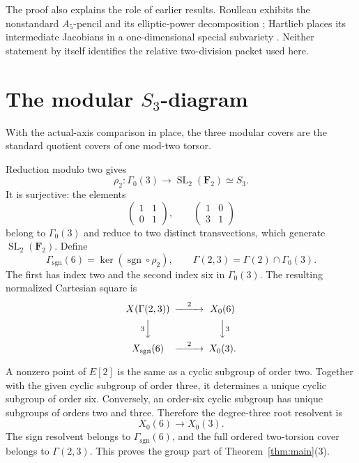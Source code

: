 \documentclass[11pt]{article}
\numberwithin{equation}{section}
\theoremstyle{definition}
\theoremstyle{remark}
\newcommand{\F}{\mathbf F}
\begin{document}
The proof also explains the role of earlier results.  Roulleau exhibits the
nonstandard \(A_5\)-pencil and its elliptic-power decomposition
\cite[Theorem 11(D) and Lemma 17]{Roulleau}; Hartlieb places its intermediate
Jacobians in a one-dimensional special subvariety
\cite[Lemma 5.5 and Proposition 5.7]{Hartlieb}.  Neither statement by itself
identifies the relative two-division packet used here.

\section{The modular \texorpdfstring{\(S_3\)}{S3}-diagram}

With the actual-axis comparison in place, the three modular covers are the
standard quotient covers of one mod-two torsor.

Reduction modulo two gives
\[
 \rho_2:\Gamma_0(3)\longrightarrow
 \operatorname{SL}_2(\F_2)\simeq S_3.
\]
It is surjective: the elements
\[
 \begin{pmatrix}1&1\\0&1\end{pmatrix},\qquad
 \begin{pmatrix}1&0\\3&1\end{pmatrix}
\]
belong to \(\Gamma_0(3)\) and reduce to two distinct transvections, which
generate \(\operatorname{SL}_2(\F_2)\).  Define
\[
 \Gamma_{\mathrm{sgn}}(6)=
 \ker(\operatorname{sgn}\circ\rho_2),
 \qquad
 \Gamma(2,3)=\Gamma(2)\cap\Gamma_0(3).
\]
The first has index two and the second index six in \(\Gamma_0(3)\).
The resulting normalized Cartesian square is
\begin{equation}\label{eq:resolvent-square}
\begin{CD}
 X(\Gamma(2,3)) @>{2}>> X_0(6)\\
 @V{3}VV                    @VV{3}V\\
 X_{\mathrm{sgn}}(6) @>{2}>> X_0(3).
\end{CD}
\end{equation}

A nonzero point of \(E[2]\) is the same as a cyclic subgroup of order two.
Together with the given cyclic subgroup of order three, it determines a
unique cyclic subgroup of order six.  Conversely, an order-six cyclic
subgroup has unique subgroups of orders two and three.  Therefore the
degree-three root resolvent is
\[
 X_0(6)\longrightarrow X_0(3).
\]
The sign resolvent belongs to \(\Gamma_{\mathrm{sgn}}(6)\), and the full
ordered two-torsion cover belongs to \(\Gamma(2,3)\).  This proves the group
part of Theorem~\ref{thm:main}(3).
\end{document}

